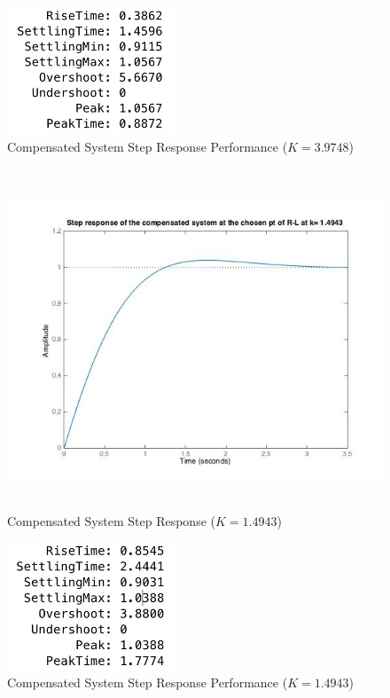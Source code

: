 \documentclass[12pt]{article}
\begin{document}
\bigskip
\bigskip
\bigskip

\begin{figure}[h!] %
   \centering
   \includegraphics[width=2in,height=1.5in]{compensated_sys_highest_rl_step_info.jpg} 
   \caption{Compensated System Step Response Performance ($K=3.9748$)}
   \label{fig:example}
\end{figure}

\newpage

\begin{figure}[h!] %
   \centering
   \includegraphics[width=5.5in,height=4in]{compensated_sys_chosen_rl_time_resp.jpg} 
   \caption{Compensated System Step Response ($K=1.4943$)}
   \label{fig:example}
\end{figure}

\bigskip
\bigskip
\bigskip

\begin{figure}[h!] %
   \centering
   \includegraphics[width=2in,height=1.5in]{compensated_sys_chosen_rl_step_info.jpg} 
   \caption{Compensated System Step Response Performance ($K=1.4943$)}
   \label{fig:example}
\end{figure}
\end{document}
